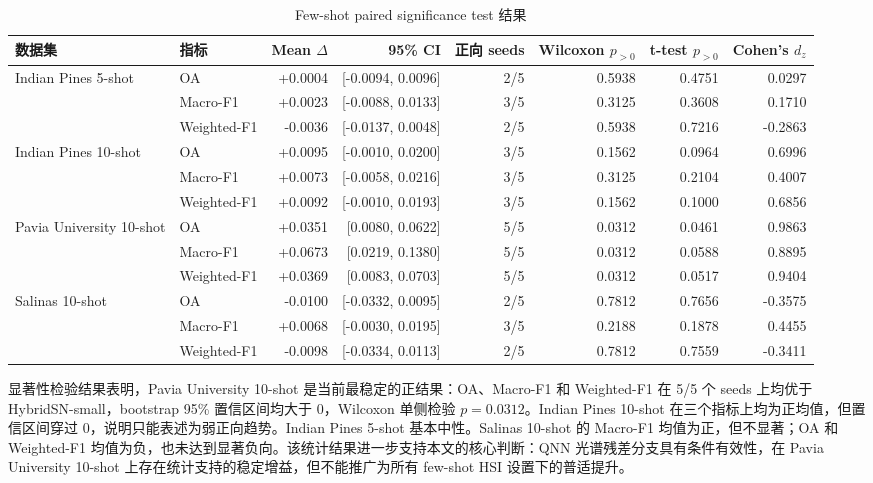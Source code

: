 \documentclass[UTF8,a4paper,zihao=-4,fontset=fandol]{ctexart}
\begin{document}
\begin{table}[htbp]
\centering
\caption{Few-shot paired significance test 结果}
\label{tab:significance}
\begin{adjustbox}{max width=\textwidth}
\begin{tabular}{llrrrrrr}
\toprule
数据集 & 指标 & Mean $\Delta$ & 95\% CI & 正向 seeds & Wilcoxon $p_{>0}$ & t-test $p_{>0}$ & Cohen's $d_z$ \\
\midrule
\multirow{3}{*}{Indian Pines 5-shot}
& OA & +0.0004 & [-0.0094, 0.0096] & 2/5 & 0.5938 & 0.4751 & 0.0297 \\
& Macro-F1 & +0.0023 & [-0.0088, 0.0133] & 3/5 & 0.3125 & 0.3608 & 0.1710 \\
& Weighted-F1 & -0.0036 & [-0.0137, 0.0048] & 2/5 & 0.5938 & 0.7216 & -0.2863 \\
\midrule
\multirow{3}{*}{Indian Pines 10-shot}
& OA & +0.0095 & [-0.0010, 0.0200] & 3/5 & 0.1562 & 0.0964 & 0.6996 \\
& Macro-F1 & +0.0073 & [-0.0058, 0.0216] & 3/5 & 0.3125 & 0.2104 & 0.4007 \\
& Weighted-F1 & +0.0092 & [-0.0010, 0.0193] & 3/5 & 0.1562 & 0.1000 & 0.6856 \\
\midrule
\multirow{3}{*}{Pavia University 10-shot}
& OA & +0.0351 & [0.0080, 0.0622] & 5/5 & 0.0312 & 0.0461 & 0.9863 \\
& Macro-F1 & +0.0673 & [0.0219, 0.1380] & 5/5 & 0.0312 & 0.0588 & 0.8895 \\
& Weighted-F1 & +0.0369 & [0.0083, 0.0703] & 5/5 & 0.0312 & 0.0517 & 0.9404 \\
\midrule
\multirow{3}{*}{Salinas 10-shot}
& OA & -0.0100 & [-0.0332, 0.0095] & 2/5 & 0.7812 & 0.7656 & -0.3575 \\
& Macro-F1 & +0.0068 & [-0.0030, 0.0195] & 3/5 & 0.2188 & 0.1878 & 0.4455 \\
& Weighted-F1 & -0.0098 & [-0.0334, 0.0113] & 2/5 & 0.7812 & 0.7559 & -0.3411 \\
\bottomrule
\end{tabular}
\end{adjustbox}
\end{table}

显著性检验结果表明，Pavia University 10-shot 是当前最稳定的正结果：OA、Macro-F1 和 Weighted-F1 在 5/5 个 seeds 上均优于 HybridSN-small，bootstrap 95\% 置信区间均大于 0，Wilcoxon 单侧检验 $p=0.0312$。Indian Pines 10-shot 在三个指标上均为正均值，但置信区间穿过 0，说明只能表述为弱正向趋势。Indian Pines 5-shot 基本中性。Salinas 10-shot 的 Macro-F1 均值为正，但不显著；OA 和 Weighted-F1 均值为负，也未达到显著负向。该统计结果进一步支持本文的核心判断：QNN 光谱残差分支具有条件有效性，在 Pavia University 10-shot 上存在统计支持的稳定增益，但不能推广为所有 few-shot HSI 设置下的普适提升。
\end{document}
